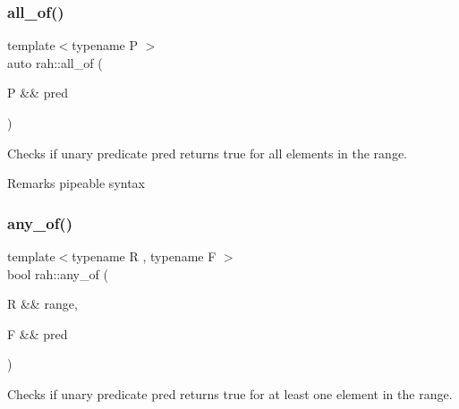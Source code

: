 \subsubsection{\texorpdfstring{all\_of()}{all\_of()}\hspace{0.1cm}{\footnotesize\ttfamily [2/2]}}
{\footnotesize\ttfamily template$<$typename P $>$ \\
auto rah\+::all\+\_\+of (\begin{DoxyParamCaption}\item[{P \&\&}]{pred }\end{DoxyParamCaption})}



Checks if unary predicate pred returns true for all elements in the range. 

\begin{DoxyRemark}{Remarks}
pipeable syntax
\end{DoxyRemark}

\begin{DoxyCodeInclude}{0}
\DoxyCodeLine{        ) == \textcolor{keyword}{false});}
\end{DoxyCodeInclude}
\mbox{\label{namespacerah_a836c57da2bd108c491f3ba96786f6aa4}} 
\subsubsection{\texorpdfstring{any\_of()}{any\_of()}\hspace{0.1cm}{\footnotesize\ttfamily [1/2]}}
{\footnotesize\ttfamily template$<$typename R , typename F $>$ \\
bool rah\+::any\+\_\+of (\begin{DoxyParamCaption}\item[{R \&\&}]{range,  }\item[{F \&\&}]{pred }\end{DoxyParamCaption})}



Checks if unary predicate pred returns true for at least one element in the range. 


